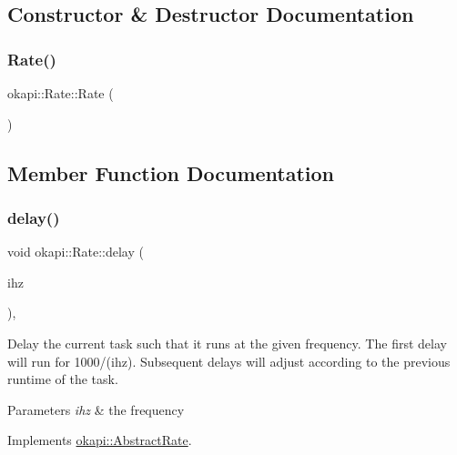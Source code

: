 \subsection{Constructor \& Destructor Documentation}
\mbox{\label{classokapi_1_1Rate_af6bc24e88c99cb3ba9b5384c80b13645}} 
\subsubsection{\texorpdfstring{Rate()}{Rate()}}
{\footnotesize\ttfamily okapi\+::\+Rate\+::\+Rate (\begin{DoxyParamCaption}{ }\end{DoxyParamCaption})\hspace{0.3cm}{\ttfamily [default]}}



\subsection{Member Function Documentation}
\mbox{\label{classokapi_1_1Rate_ad066b6b32b6d43f4ccbb66617018e1fc}} 
\subsubsection{\texorpdfstring{delay()}{delay()}\hspace{0.1cm}{\footnotesize\ttfamily [1/2]}}
{\footnotesize\ttfamily void okapi\+::\+Rate\+::delay (\begin{DoxyParamCaption}\item[{Q\+Frequency}]{ihz }\end{DoxyParamCaption})\hspace{0.3cm}{\ttfamily [override]}, {\ttfamily [virtual]}}

Delay the current task such that it runs at the given frequency. The first delay will run for 1000/(ihz). Subsequent delays will adjust according to the previous runtime of the task.


\begin{DoxyParams}{Parameters}
{\em ihz} & the frequency \\
\hline
\end{DoxyParams}


Implements \mbox{\hyperlink{classokapi_1_1AbstractRate_ab1abf71d6cf3184abeed1d3556d39d4f}{okapi\+::\+Abstract\+Rate}}.

